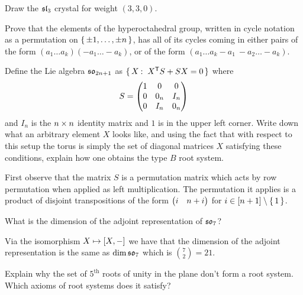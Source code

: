 \documentclass[12pt]{memoir}
\begin{document}
\begin{Ej}
Draw the $\mathfrak{sl}_3$ crystal for weight $(3,3,0)$.
\end{Ej}

\begin{Ej}
    Prove that the elements of the hyperoctahedral group, written in cycle notation as a permutation on $\{\,\pm1,\dots , \pm n\,\}$, has all of its cycles coming in either pairs of the form $(a_1\dots a_k)(-a_1\dots -a_k)$, or of the form $(a_1\dots a_k -a_1\ -a_2\dots-a_k)$.
\end{Ej}

\begin{Ej}
    Define the Lie algebra $\mathfrak{so}_{2n+1}$ as $\{\,X\mathbin{:}\ X^{\mathsf{T}} S+SX=0\,\}$ where 
    $$S=\begin{pmatrix} 1 & 0 & 0 \\ 0 & 0_n & I_n \\ 0 & I_n & 0_n \end{pmatrix}$$
    and $I_n$ is the $n\times n$ identity matrix and $1$ is in the upper left corner. Write down what an arbitrary element $X$ looks like, and using the fact that with respect to this setup the torus is simply the set of diagonal matrices $X$ satisfying these conditions, explain how one obtains the type $B$ root system.
\end{Ej}

\begin{ptcbr}
    First observe that the matrix $S$ is a permutation matrix which acts by row permutation when applied as left multiplication. The permutation it applies is a product of disjoint transpositions of the form $\begin{pmatrix} i & n+i \end{pmatrix}$ for $i\in[n+1]\setminus\{\,1\,\}$.
\end{ptcbr}

\begin{Ej}
    What is the dimension of the adjoint representation of $\mathfrak{so}_7$?
\end{Ej}


\begin{ptcbr}
    Via the isomorphism $X\mapsto\left\lbrack X,-\right\rbrack$ we have that the dimension of the adjoint representation is the same as $\dim\mathfrak{so}_7$ which is $\binom{7}{2}=21$.
\end{ptcbr}

\begin{Ej}
    Explain why the set of $5^{\text{th}}$ roots of unity in the plane don't form a root system. Which axioms of root systems does it satisfy?
\end{Ej}
\end{document}
